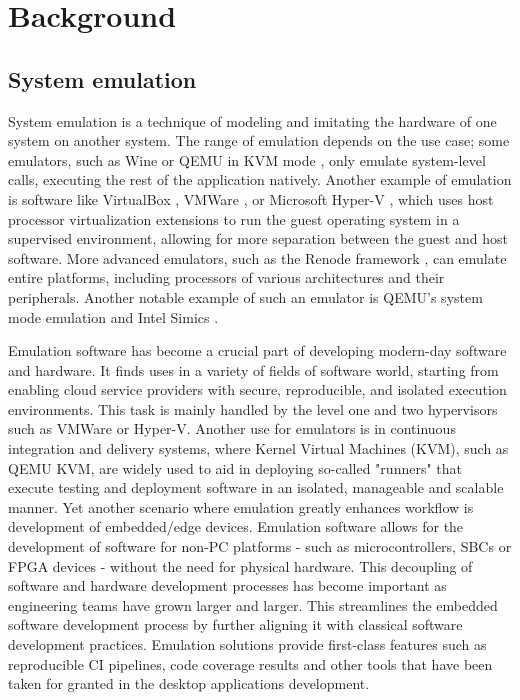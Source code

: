 
\chapter{Background}


\section{System emulation}

System emulation is a technique of modeling and imitating the hardware of one system on another system. The range of emulation depends on the use case; some emulators, such as Wine \cite{Wine}
or QEMU in KVM mode \cite{QemuKVM}, only emulate system-level calls, executing the rest of the application natively. Another example of emulation is software like VirtualBox \cite{VirtualBox}, VMWare \cite{VMWareWorkstation}, or Microsoft
Hyper-V \cite{hyperv}, which uses host processor virtualization extensions to run the guest operating system in a supervised environment, allowing for more separation between the guest and host software.
More advanced emulators, such as the Renode framework \cite{Renode}, can emulate entire platforms, including processors of various architectures and their peripherals. Another notable example of
such an emulator is QEMU's system mode emulation \cite{Qemu} and Intel Simics \cite{simics}.

Emulation software has become a crucial part of developing modern-day software and hardware. It finds uses in a variety of fields of software world, starting from enabling cloud
service providers with secure, reproducible, and isolated execution environments. This task is mainly handled by the level one and two hypervisors such as VMWare or Hyper-V.
Another use for emulators is in continuous integration and delivery systems, where Kernel Virtual Machines (KVM), such as QEMU KVM, are widely used to aid in deploying
so-called "runners" that execute testing and deployment software in an isolated, manageable and scalable manner. Yet another scenario where emulation greatly enhances workflow is
development of embedded/edge devices. Emulation software allows for the development of software for non-PC platforms - such as microcontrollers, SBCs or FPGA devices - without the
need for physical hardware. This decoupling of software and hardware development processes has become important as engineering teams have grown larger and larger. This streamlines the embedded software development process by
further aligning it with classical software development practices. Emulation solutions provide first-class features such as reproducible CI pipelines, code coverage results and
other tools that have been taken for granted in the desktop applications development.
%


